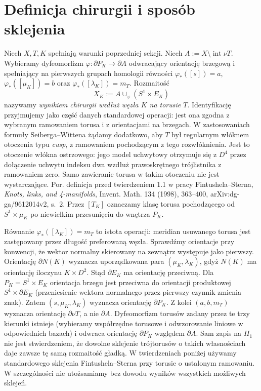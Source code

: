 \section{Definicja chirurgii i sposób sklejenia}
\label{sec:tg-ks-glue}

\begin{definicja}
\label{def:tg-ks-operation}
Niech $X,T,K$ spełniają warunki poprzedniej sekcji.
Niech $A:=X\setminus\operatorname{int}\nu T$.
Wybieramy dyfeomorfizm $\varphi:\partial P_K\to\partial A$
odwracający orientację brzegową i spełniający na
pierwszych grupach homologii równości
$\varphi_*([s])=a$, $\varphi_*([\mu_K])=b$
oraz $\varphi_*([\lambda_K])=m_T$.
Rozmaitość
\[
X_K:=A\cup_\varphi(S^1\times E_K)
\]
nazywamy \emph{wynikiem chirurgii wzdłuż węzła $K$ na torusie $T$}.
Identyfikację przyjmujemy jako część danych standardowej
operacji: jest ona zgodna z wybranym ramowaniem torusa
i z orientacjami na brzegach. W zastosowaniach
formuły Seiberga--Wittena żądamy dodatkowo, aby $T$
był regularnym włóknem otoczenia typu \emph{cusp},
z ramowaniem pochodzącym z tego rozwłóknienia.
Jest to otoczenie włókna ostrzowego: jego model
uchwytowy otrzymuje się z $D^4$ przez dołączenie
uchwytu indeksu dwa wzdłuż prawoskrętnego
trójlistnika z ramowaniem zero. Samo zawieranie
torusa w takim otoczeniu nie jest wystarczające.
Por. definicja przed twierdzeniem 1.1 w pracy
Fintushela--Sterna, \emph{Knots, links, and 4-manifolds},
Invent. Math. 134 (1998), 363--400,
arXiv:dg-ga/9612014v2, s.~2.
Przez $[T_K]$
oznaczamy klasę torusa pochodzącego od
$S^1\times\mu_K$ po niewielkim przesunięciu do wnętrza $P_K$.
\end{definicja}

\begin{uwaga}
Równanie $\varphi_*([\lambda_K])=m_T$ to istota
operacji: meridian usuwanego torusa jest zastępowany
przez długość preferowaną węzła.
Sprawdźmy orientacje przy konwencji, że wektor normalny
skierowany na zewnątrz występuje jako pierwszy.
Orientację $\partial N(K)$ wyznacza uporządkowana
para $(\mu_K,\lambda_K)$, gdyż $N(K)$ ma orientację
iloczynu $K\times D^2$. Stąd $\partial E_K$
ma orientację przeciwną. Dla $P_K=S^1\times E_K$
orientacja brzegu jest przeciwna do orientacji
produktowej $S^1\times\partial E_K$ (przeniesienie
wektora normalnego przez pierwszy czynnik
zmienia znak). Zatem $(s,\mu_K,\lambda_K)$
wyznacza orientację $\partial P_K$. Z kolei
$(a,b,m_T)$ wyznacza orientację $\partial\nu T$,
a nie $\partial A$. Dyfeomorfizm torusów
zadany przez te trzy kierunki istnieje
(wybieramy współrzędne torusowe i odwzorowanie liniowe
w odpowiednich bazach) i odwraca orientację
$\partial P_K$ względem $\partial A$. Sam zapis na $H_1$
nie jest stwierdzeniem, że dowolne sklejenie trójtorusów
o takich własnościach daje zawsze tę samą rozmaitość
gładką. W twierdzeniach poniżej używamy standardowego
sklejenia Fintushela--Sterna przy torusie o ustalonym
ramowaniu. W szczególności nie utożsamiamy bez dowodu
wyników wszystkich możliwych sklejeń.
\end{uwaga}

